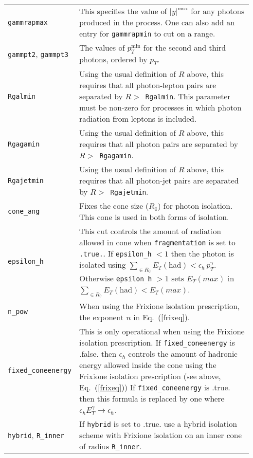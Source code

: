 \begin{longtable}{p{3.5cm}p{12cm}}
		{\tt gammrapmax} & This specifies the value
		of $|y|^{\mathrm{max}}$ for any photons produced in the process. One can also add an entry
		for \texttt{gammrapmin} to cut on a range. \\
		
		{\tt gammpt2}, {\tt gammpt3} & The values
		of $p_T^{\mathrm{min}}$ for the second and third photons, ordered by $p_T$. \\
		
		{\tt Rgalmin} & Using the usual definition of $R$ above,
		this requires that all photon-lepton pairs are separated by
		$R >$~{\tt Rgalmin}. This parameter must be non-zero
		for processes in which photon radiation from leptons is included. \\
		
		{\tt Rgagamin} & Using the usual definition of $R$ above,
		this requires that all photon pairs are separated by
		$R >$~{\tt Rgagamin}. \\
		
		{\tt Rgajetmin} & Using the usual definition of $R$ above,
		this requires that all photon-jet pairs are separated by
		$R >$~{\tt Rgajetmin}. \\
		
		{\tt cone\_ang} & Fixes the cone size ($R_0$) for photon isolation.
		This cone is used in both forms of isolation. \\
		
		{\tt epsilon\_h} & This cut controls the amount of radiation allowed in cone when  {\tt fragmentation} is set 
		to 
		{\tt .true.}. If  {\tt epsilon\_h} $ < 1$ then the photon is isolated using
		$\sum_{\in R_0} E_T{\mathrm{(had)}} < \epsilon_h \, p^{\gamma}_{T}.$ Otherwise {\tt epsilon\_h}  $ > 1$ sets 
		$E_T(max)$ in  $\sum_{\in R_0} E_T{\mathrm{(had)}} < E_T(max)$. \\
		
		{\tt n\_pow} & When using the Frixione isolation prescription, the exponent $n$ in Eq.~(\ref{frixeq}). \\
		
                {\tt fixed\_coneenergy} & This is only operational when using the Frixione isolation prescription.
		If {\tt fixed\_coneenergy} is .false. then $\epsilon_h$ controls the amount of hadronic energy allowed 
		inside the cone using the
		Frixione isolation prescription (see above, Eq.~(\ref{frixeq}))
		If {\tt fixed\_coneenergy} is .true. then this formula
		is replaced by one where $\epsilon_h E_T^\gamma \rightarrow \epsilon_h$. \\		

                {\tt hybrid}, {\tt  R\_inner} & If {\tt hybrid} is set to .true. use a hybrid isolation scheme
		with Frixione isolation on an inner cone of radius {\tt  R\_inner}. \\
    \hline
	\end{longtable}
